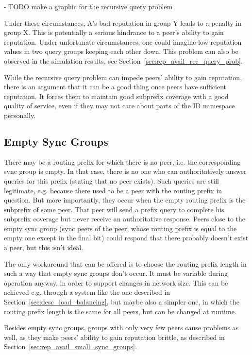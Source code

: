 - TODO make a graphic for the recursive query problem

Under these circumstances, A's bad reputation in group Y leads to a penalty in
group X. This is potentially a serious hindrance to a peer's ability to gain
reputation. Under unfortunate circumstances, one could imagine low reputation
values in two query groups keeping each other down. This problem can also be
observed in the simulation results, see
Section~\ref{sec:rep_avail_rec_query_prob}.

While the recursive query problem can impede peers' ability to gain reputation,
there is an argument that it can be a good thing once peers have sufficient
reputation. It forces them to maintain good subprefix coverage with a good
quality of service, even if they may not care about parts of the ID namespace
personally.

\subsection{Empty Sync Groups}
\label{sec:desc_empty_sync_groups}
There may be a routing prefix for which there is no peer, i.e. the corresponding
sync group is empty. In that case, there is no one who can authoritatively
answer queries for this prefix (stating that no peer exists). Such queries are
still legitimate, e.g. because there used to be a peer with the routing prefix
in question. But more importantly, they occur when the empty routing prefix is
the subprefix of some peer. That peer will send a prefix query to complete his
subprefix coverage but never receive an authoritative response. Peers close to
the empty sync group (sync peers of the peer, whose routing prefix is equal to
the empty one except in the final bit) could respond that there probably doesn't
exist a peer, but this isn't ideal.

The only workaround that can be offered is to choose the routing prefix length
in such a way that empty sync groups don't occur. It must be variable during
operation anyway, in order to support changes in network size. This can be
achieved e.g. through a system like the one described in
Section~\ref{sec:desc_load_balancing}, but maybe also a simpler one, in which
the routing prefix length is the same for all peers, but can be changed at
runtime.

Besides empty sync groups, groups with only very few peers cause problems as
well, as they make peers' ability to gain reputation brittle, as described in
Section~\ref{sec:rep_avail_small_sync_groups}.

